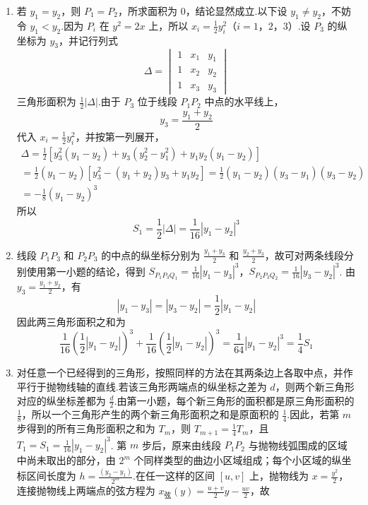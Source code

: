 \begin{solution}
\begin{enumerate}
\item 若 \(y_1=y_2\)，则 \(P_1=P_2\)，所求面积为 \(0\)，结论显然成立.以下设 \(y_1\ne y_2\)，不妨令 \(y_1<y_2\).因为 \(P_i\) 在 \(y^2=2x\) 上，所以 \(x_i=\frac12y_i^2\)（\(i=1\)，\(2\)，\(3\)）.设 \(P_3\) 的纵坐标为 \(y_3\)，并记行列式
\[
\Delta=\begin{vmatrix}
1 & x_1 & y_1\\
1 & x_2 & y_2\\
1 & x_3 & y_3
\end{vmatrix}
\]
三角形面积为 \(\frac12|\Delta|\).由于 \(P_3\) 位于线段 \(P_1P_2\) 中点的水平线上，
\[
y_3=\frac{y_1+y_2}{2}
\]
代入 \(x_i=\frac12y_i^2\)，并按第一列展开，
\[
\begin{gathered}
\Delta=\frac12\left[y_3^2(y_1-y_2)+y_3(y_2^2-y_1^2)+y_1y_2(y_1-y_2)\right]\\
=\frac12(y_1-y_2)\left[y_3^2-(y_1+y_2)y_3+y_1y_2\right]
=\frac12(y_1-y_2)(y_3-y_1)(y_3-y_2)\\
=-\frac18(y_1-y_2)^3
\end{gathered}
\]
所以
\[
S_1=\frac12|\Delta|=\frac1{16}|y_1-y_2|^3
\]

\item 线段 \(P_1P_3\) 和 \(P_2P_3\) 的中点的纵坐标分别为 \(\frac{y_1+y_3}{2}\) 和 \(\frac{y_2+y_3}{2}\)，故可对两条线段分别使用第一小题的结论，得到 \(S_{P_1P_3Q_1}=\frac1{16}|y_1-y_3|^3\)，\(S_{P_2P_3Q_2}=\frac1{16}|y_3-y_2|^3\).
由 \(y_3=\frac{y_1+y_2}{2}\)，有
\[
|y_1-y_3|=|y_3-y_2|=\frac12|y_1-y_2|
\]
因此两三角形面积之和为
\[
\frac1{16}\left(\frac12|y_1-y_2|\right)^3+\frac1{16}\left(\frac12|y_1-y_2|\right)^3
=\frac1{64}|y_1-y_2|^3=\frac14S_1
\]

\item 对任意一个已经得到的三角形，按照同样的方法在其两条边上各取中点，并作平行于抛物线轴的直线.若该三角形两端点的纵坐标之差为 \(d\)，则两个新三角形对应的纵坐标差都为 \(\frac{d}{2}\).由第一小题，每个新三角形的面积都是原三角形面积的 \(\frac18\)，所以一个三角形产生的两个新三角形面积之和是原面积的 \(\frac14\).因此，若第 \(m\) 步得到的所有三角形面积之和为 \(T_m\)，则
\(T_{m+1}=\frac14T_m\)，且 \(T_1=S_1=\frac1{16}|y_1-y_2|^3\).
第 \(m\) 步后，原来由线段 \(P_1P_2\) 与抛物线弧围成的区域中尚未取出的部分，由 \(2^m\) 个同样类型的曲边小区域组成；每个小区域的纵坐标区间长度为 \(h=\frac{(y_2-y_1)}{2^m}\).在任一这样的区间 \([u,v]\) 上，抛物线为 \(x=\frac{y^2}{2}\)，连接抛物线上两端点的弦方程为 \(x_{\text{弦}}(y)=\frac{u+v}{2}y-\frac{uv}{2}\)，故


\end{enumerate}
\end{solution}
